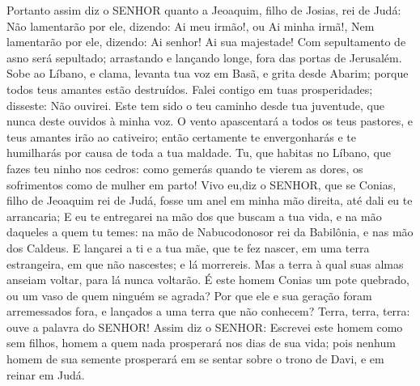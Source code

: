 {Portanto assim diz o SENHOR quanto a Jeoaquim, filho de Josias, rei de Judá: Não lamentarão por ele, dizendo: Ai meu irmão!, ou Ai minha irmã!, Nem lamentarão por ele, dizendo: Ai senhor! Ai sua majestade!
Com sepultamento de asno será sepultado; arrastando e lançando
{} longe, fora das portas de Jerusalém.
Sobe ao Líbano, e clama, levanta tua voz em Basã, e grita desde Abarim; porque todos teus amantes
 estão destruídos.
Falei contigo em tuas prosperidades;
{} disseste: Não ouvirei. Este tem sido o teu caminho desde tua juventude, que nunca deste ouvidos
 à minha voz.
O vento apascentará a todos os teus pastores, e teus amantes irão ao cativeiro; então certamente te envergonharás e te humilharás por causa de toda a tua maldade.
Tu, que habitas no Líbano, que fazes teu ninho nos cedros: como gemerás quando te vierem as dores, os sofrimentos como de mulher em parto!
Vivo eu,diz o SENHOR, que se Conias, filho de Jeoaquim rei de Judá, fosse um anel em minha mão direita, até dali eu te arrancaria;
E eu te entregarei na mão dos que buscam a tua vida, e na mão daqueles a quem tu temes: na mão de Nabucodonosor rei da Babilônia, e nas mão dos Caldeus.
E lançarei a ti e a tua mãe, que te fez nascer, em uma terra estrangeira, em que não nascestes; e lá morrereis.
Mas a terra à qual suas almas anseiam voltar, para lá nunca voltarão.
É este homem Conias um pote quebrado, ou um vaso de quem ninguém se agrada? Por que ele e sua geração foram arremessados fora, e lançados a uma terra que não conhecem?
Terra, terra, terra: ouve a palavra do SENHOR!
Assim diz o SENHOR: Escrevei este homem como sem filhos, homem a quem nada prosperará nos dias de sua vida; pois nenhum homem de sua semente
 prosperará em se sentar sobre o trono de Davi, e em reinar em Judá.

\par }

